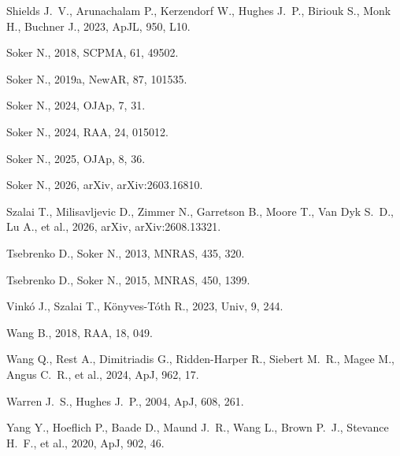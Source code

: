 \documentclass[twocolumn]{aastex701}
\begin{document}
\begin{thebibliography}{}
 Shields J.~V., Arunachalam P., Kerzendorf W., Hughes J.~P., Biriouk S., Monk H., Buchner J., 2023, ApJL, 950, L10. 

 Soker N., 2018, SCPMA, 61, 49502. 

 Soker N., 2019a, NewAR, 87, 101535. 

 Soker N., 2024, OJAp, 7, 31. 

 Soker N., 2024, RAA, 24, 015012. 

 Soker N., 2025, OJAp, 8, 36. 

 Soker N., 2026, arXiv, arXiv:2603.16810. 

 Szalai T., Milisavljevic D., Zimmer N., Garretson B., Moore T., Van Dyk S.~D., Lu A., et al., 2026, arXiv, arXiv:2608.13321. 


 Tsebrenko D., Soker N., 2013, MNRAS, 435, 320. 

 Tsebrenko D., Soker N., 2015, MNRAS, 450, 1399. 

 Vink{\'o} J., Szalai T., K{\"o}nyves-T{\'o}th R., 2023, Univ, 9, 244. 

 Wang B., 2018, RAA, 18, 049. 
 
 Wang Q., Rest A., Dimitriadis G., Ridden-Harper R., Siebert M.~R., Magee M., Angus C.~R., et al., 2024, ApJ, 962, 17. 

 Warren J.~S., Hughes J.~P., 2004, ApJ, 608, 261. 

 Yang Y., Hoeflich P., Baade D., Maund J.~R., Wang L., Brown P.~J., Stevance H.~F., et al., 2020, ApJ, 902, 46. 

\end{thebibliography}
\end{document}
